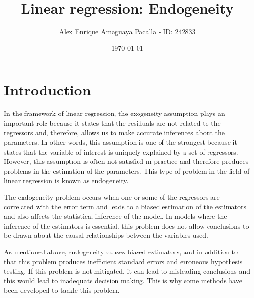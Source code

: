 \documentclass{article}
\begin{document}
\title{Linear regression: Endogeneity}
\author{Alex Enrique Amaguaya Pacalla - ID: 242833}
\date{\today}
\maketitle

\tableofcontents

\listoftables
\listoffigures
\listofalgorithms
\printnomenclature


\newpage
\section{Introduction}

In the framework of linear regression, the exogeneity assumption plays an important role because it states that the residuals are not related to the regressors and, therefore, allows us to make accurate inferences about the parameters. In other words, this assumption is one of the strongest because it states that the variable of interest is uniquely explained by a set of regressors. However, this assumption is often not satisfied in practice and therefore produces problems in the estimation of the parameters. This type of problem in the field of linear regression is known as endogeneity.

The endogeneity problem occurs when one or some of the regressors are correlated with the error term and leads to a biased estimation of the estimators and also affects the statistical inference of the model. In models where the inference of the estimators is essential, this problem does not allow conclusions to be drawn about the causal relationships between the variables used.

As mentioned above, endogeneity causes biased estimators, and in addition to that this problem produces inefficient standard errors and erroneous hypothesis testing. If this problem is not mitigated, it can lead to misleading conclusions and this would lead to inadequate decision making. This is why some methods have been developed to tackle this problem.
\end{document}
